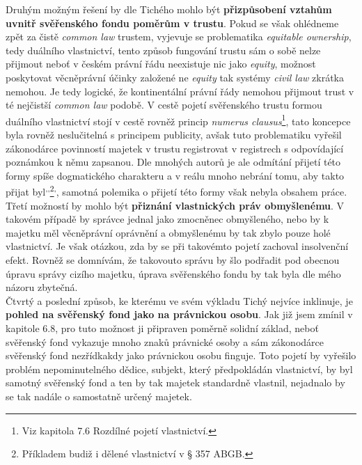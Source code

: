 \documentclass{article}
\begin{document}
Druhým možným řešení by dle Tichého mohlo být \textbf{přizpůsobení vztahům uvnitř svěřenského fondu poměrům v trustu}. Pokud se však ohlédneme zpět za čistě \textit{common law} trustem, vyjevuje se problematika \textit{equitable ownership}, tedy duálního vlastnictví, tento způsob fungování trustu sám o sobě nelze přijmout neboť v českém právní řádu neexistuje nic jako \textit{equity}, možnost poskytovat věcněprávní účinky založené ne \textit{equity} tak systémy \textit{civil law} zkrátka nemohou. Je tedy logické, že kontinentální právní řády nemohou přijmout trust v té nejčistší \textit{common law} podobě. V cestě pojetí svěřenského trustu formou duálního vlastnictví stojí v cestě rovněž princip \textit{numerus clausus}\footnote{Viz kapitola 7.6 Rozdílné pojetí vlastnictví.}, tato koncepce byla rovněž neslučitelná s principem publicity, avšak tuto problematiku vyřešil zákonodárce povinností majetek v trustu registrovat v registrech s odpovídající poznámkou k němu zapsanou. Dle mnohých autorů je ale odmítání přijetí této formy spíše dogmatického charakteru a v reálu mnoho nebrání tomu, aby takto přijat byl\textsuperscript{,}\textsuperscript{,}\footnote{Příkladem budiž i dělené vlastnictví v § 357 ABGB.}\textsuperscript{,}, samotná polemika o přijetí této formy však nebyla obsahem práce.\\

Třetí možností by mohlo být \textbf{přiznání vlastnických práv obmyšlenému}. V takovém případě by správce jednal jako zmocněnec obmyšleného, nebo by k majetku měl věcněprávní oprávnění a obmyšlenému by tak zbylo pouze holé vlastnictví. Je však otázkou, zda by se při takovémto pojetí zachoval insolvenční efekt. Rovněž se domnívám, že takovouto správu by šlo podřadit pod obecnou úpravu správy cizího majetku, úprava svěřenského fondu by tak byla dle mého názoru zbytečná.\\


Čtvrtý a poslední způsob, ke kterému ve svém výkladu Tichý nejvíce inklinuje, je \textbf{pohled na svěřenský fond jako na právnickou osobu}. Jak již jsem zmínil v kapitole 6.8, pro tuto možnost ji připraven poměrně solidní základ, neboť svěřenský fond vykazuje mnoho znaků právnické osoby a sám zákonodárce svěřenský fond nezřídkakdy jako právnickou osobu finguje. Toto pojetí by vyřešilo problém nepominutelného dědice, subjekt, který předpokládán vlastnictví, by byl samotný svěřenský fond a ten by tak majetek standardně vlastnil, nejadnalo by se tak nadále o samostatně určený majetek.\\
\end{document}

